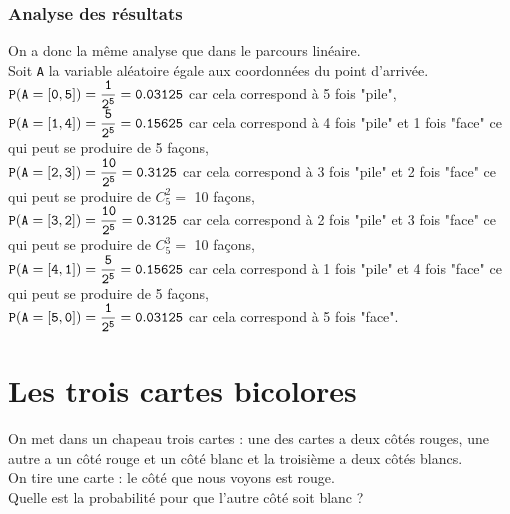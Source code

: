 \documentclass[a4paper,11pt]{book}
\begin{document}
\subsubsection{Analyse des r\'esultats}
On a donc la m\^eme analyse que dans le parcours lin\'eaire. \\
Soit {\tt A} la variable al\'eatoire \'egale aux coordonn\'ees du point d'arriv\'ee.\\
$\displaystyle {\tt P(A=[0,5])=\frac{1}{2^5}= 0.03125}$ car cela correspond \`a 5 fois "pile",\\
$\displaystyle {\tt P(A=[1,4])=\frac{5}{2^5}=0.15625}$ car cela correspond \`a 4 fois "pile" et 1 
fois "face" ce qui peut se produire de 5 fa\c{c}ons, \\
$\displaystyle {\tt P(A=[2,3])=\frac{10}{2^5}=0.3125}$ car cela correspond \`a 3 fois "pile" et 2 
fois "face" ce qui peut se produire de $C_5^2=$ 10 fa\c{c}ons, \\
$\displaystyle {\tt P(A=[3,2])=\frac{10}{2^5}= 0.3125}$ car cela correspond \`a 2 fois "pile" et 3 
fois "face" ce qui peut se produire de $C_5^3=$ 10 fa\c{c}ons, \\
$\displaystyle {\tt P(A=[4,1])=\frac{5}{2^5}=0.15625}$ car cela correspond \`a 1 fois "pile" et 4
fois "face" ce qui peut se produire de 5 fa\c{c}ons, \\
$\displaystyle {\tt P(A=[5,0])=\frac{1}{2^5}= 0.03125}$ car cela correspond \`a 5 fois "face".
\section{Les trois cartes bicolores}
On met dans un chapeau trois cartes : une des cartes a deux c\^ot\'es rouges,
 une autre a un c\^ot\'e rouge et un c\^ot\'e blanc et la troisi\`eme a deux
 c\^ot\'es blancs.\\
On tire une carte : le c\^ot\'e que nous voyons est rouge.\\
Quelle est la probabilit\'e pour que l'autre c\^ot\'e soit blanc ?   
\end{document}
